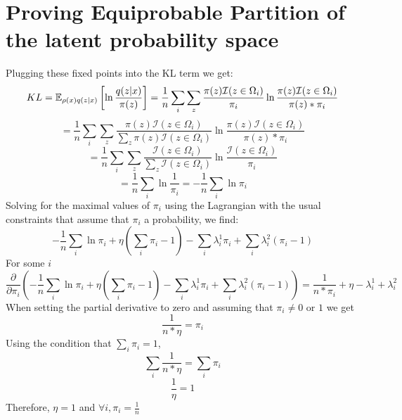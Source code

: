 \section*{Proving Equiprobable Partition of the latent probability space}
Plugging these fixed points into the KL term we get:
\setcounter{equation}{0}
\begin{equation}
KL = \operatorname{\mathbb{E}}_{\rho(x)q(z|x)}\left[\ln{\frac{q(z|x)}{\pi(z)}}\right] = \frac{1}{n} \sum_i \sum_z \frac{\pi(z)\mathcal{I}({z\in\Omega_{i}})}{\pi_{i}}\ln{\frac{\pi(z)\mathcal{I}(z\in\Omega_i)}{\pi(z)*\pi_i}}
\end{equation}
\begin{equation}
= \frac{1}{n} \sum_i \sum_z \frac{\pi(z)\mathcal{I}({z\in\Omega_{i}})}{\sum_z \pi(z)\mathcal{I}(z\in\Omega_i)}\ln{\frac{\pi(z)\mathcal{I}(z\in\Omega_i)}{\pi(z)*\pi_i}}
\end{equation}
\begin{equation}
= \frac{1}{n} \sum_i \sum_z \frac{\mathcal{I}({z\in\Omega_{i}})}{\sum_z \mathcal{I}(z\in\Omega_i)}\ln{\frac{\mathcal{I}(z\in\Omega_i)}{\pi_i}}
\end{equation}
\begin{equation}
= \frac{1}{n} \sum_i \ln{\frac{1}{\pi_i}} = -\frac{1}{n} \sum_i \ln{\pi_i}
\end{equation}
Solving for the maximal values of $\pi_i$ using the Lagrangian with the usual constraints that assume that $\pi_i$ a probability, we find:
\begin{equation}
-\frac{1}{n}\sum_i\ln{\pi_i} +\eta(\sum_i\pi_i-1)-\sum_i\lambda_i^1\pi_i +\sum_i\lambda_i^2(\pi_i-1)
\end{equation}
For some $i$
\begin{equation}
\frac{\partial}{\partial \pi_i}\left(-\frac{1}{n}\sum_i\ln{\pi_i} +\eta(\sum_i\pi_i-1)-\sum_i\lambda_i^1\pi_i +\sum_i\lambda_i^2(\pi_i-1)\right)= \frac{1}{n*\pi_i} + \eta - \lambda_i^1 + \lambda_i^2
\end{equation}
When setting the partial derivative to zero and assuming that $\pi_i \neq 0$ or $1$ we get
\begin{equation}
\frac{1}{n*\eta} = \pi_i
\end{equation}
Using the condition that $\sum_i\pi_i=1$,
\begin{equation}
\sum_i\frac{1}{n*\eta} = \sum_i\pi_i
\end{equation}
\begin{equation}
\frac{1}{\eta} = 1
\end{equation}
Therefore, $\eta = 1$ and $\forall i, \pi_i = \frac{1}{n}$

